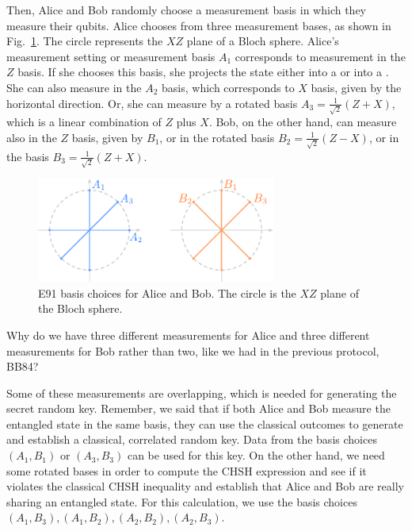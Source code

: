 Then, Alice and Bob randomly choose a measurement basis in which they measure their qubits. Alice chooses from three measurement bases, as shown in Fig.~\ref{fig:e91-bases}. The circle represents the $XZ$ plane of a Bloch sphere. Alice's measurement setting or measurement basis $A_1$ corresponds to measurement in the $Z$ basis. If she chooses this basis, she projects the state either into a  or into a . She can also measure in the $A_2$ basis, which corresponds to $X$ basis, given by the horizontal direction. Or, she can measure by a rotated basis $A_3=\frac{1}{\sqrt{2}}(Z+X)$, which is a linear combination of $Z$ plus $X$. Bob, on the other hand, can measure also in the $Z$ basis, given by $B_1$, or in the rotated basis $B_2 = \frac{1}{\sqrt{2}}(Z-X)$, or in the basis $B_3=\frac{1}{\sqrt{2}}(Z+X)$.

\begin{figure}[H]
    \centering
    \includegraphics[width=0.7\textwidth]{lesson10/10-3_bases.pdf}
        \caption{E91 basis choices for Alice and Bob.  The circle is the $XZ$ plane of the Bloch sphere.}
    \label{fig:e91-bases}
\end{figure}

Why do we have three different measurements for Alice and three different measurements for Bob rather than two, like we had in the previous protocol, BB84?

Some of these measurements are overlapping, which is needed for generating the secret random key. Remember, we said that if both Alice and Bob measure the entangled state in the same basis, they can use the classical outcomes to generate and establish a classical, correlated random key. Data from the basis choices $(A_1, B_1)$ or $(A_3,B_3)$ can be used for this key. On the other hand, we need some rotated bases in order to compute the CHSH expression and see if it violates the classical CHSH inequality and establish that Alice and Bob are really sharing an entangled state. For this calculation, we use the basis choices $(A_1,B_3), (A_1,B_2), (A_2,B_2), (A_2,B_3)$.

